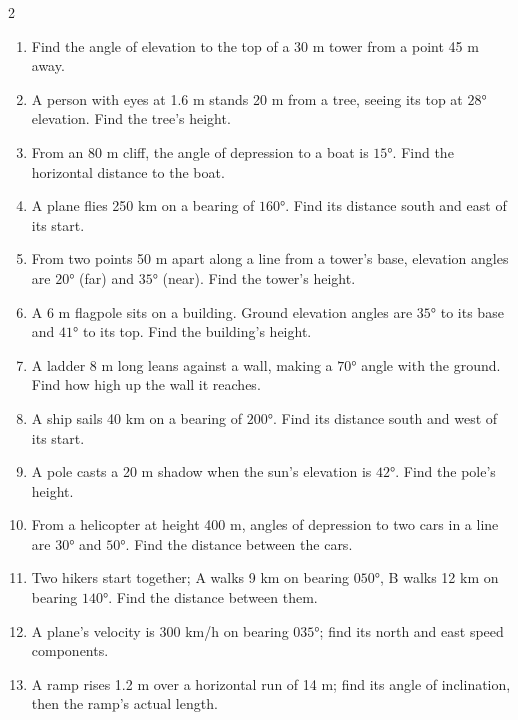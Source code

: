 \documentclass[11pt]{article}
\begin{document}
\begin{recapbox}
\begin{multicols}{2}
\small
\begin{enumerate}[leftmargin=*,itemsep=3pt]
  \item Find the angle of elevation to the top of a 30 m tower from a point 45 m away.
  \item A person with eyes at 1.6 m stands 20 m from a tree, seeing its top at $28°$ elevation. Find the tree's height.
  \item From an 80 m cliff, the angle of depression to a boat is $15°$. Find the horizontal distance to the boat.
  \item A plane flies 250 km on a bearing of $160°$. Find its distance south and east of its start.
  \item From two points 50 m apart along a line from a tower's base, elevation angles are $20°$ (far) and $35°$ (near). Find the tower's height.
  \item A 6 m flagpole sits on a building. Ground elevation angles are $35°$ to its base and $41°$ to its top. Find the building's height.
  \item A ladder 8 m long leans against a wall, making a $70°$ angle with the ground. Find how high up the wall it reaches.
  \item A ship sails 40 km on a bearing of $200°$. Find its distance south and west of its start.
  \item A pole casts a 20 m shadow when the sun's elevation is $42°$. Find the pole's height.
  \item From a helicopter at height 400 m, angles of depression to two cars in a line are $30°$ and $50°$. Find the distance between the cars.
  \item Two hikers start together; A walks 9 km on bearing $050°$, B walks 12 km on bearing $140°$. Find the distance between them.
  \item A plane's velocity is 300 km/h on bearing $035°$; find its north and east speed components.
  \item A ramp rises 1.2 m over a horizontal run of 14 m; find its angle of inclination, then the ramp's actual length.
\end{enumerate}
\end{multicols}
\end{recapbox}
\end{document}
